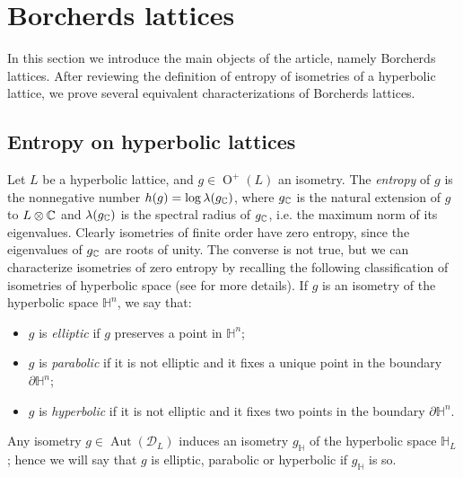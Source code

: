 \documentclass[11pt,letterpaper]{amsart}
\DeclareMathOperator{\Aut}{Aut}
\DeclareMathOperator{\Or}{O}
\begin{document}
\section{Borcherds lattices} \label{sec:Borcherds.lattices}

In this section we introduce the main objects of the article, namely Borcherds lattices. After reviewing the definition of entropy of isometries of a hyperbolic lattice, we prove several equivalent characterizations of Borcherds lattices.

\subsection{Entropy on hyperbolic lattices}

Let $L$ be a hyperbolic lattice, and $g\in \Or^+(L)$ an isometry. The \emph{entropy} of $g$ is the nonnegative number $h(g)=\log{\lambda(g_{\mathbb{C}})}$, where $g_{\mathbb{C}}$ is the natural extension of $g$ to $L\otimes \mathbb{C}$ and $\lambda(g_{\mathbb{C}})$ is the spectral radius of $g_{\mathbb{C}}$, i.e. the maximum norm of its eigenvalues.
Clearly isometries of finite order have zero entropy, since the eigenvalues of $g_{\mathbb{C}}$ are roots of unity. The converse is not true, but we can characterize isometries of zero entropy by recalling the following classification of isometries of hyperbolic space (see \cite{ratcliffe} for more details).
If $g$ is an isometry of the hyperbolic space $\mathbb{H}^n$, we say that:
\begin{itemize}
    \item $g$ is \emph{elliptic} if $g$ preserves a point in $\mathbb{H}^n$;
    \item $g$ is \emph{parabolic} if it is not elliptic and it fixes a unique point in the boundary $\partial\mathbb{H}^n$;
    \item $g$ is \emph{hyperbolic} if it is not elliptic and it fixes two points in the boundary $\partial\mathbb{H}^n$.
\end{itemize}

Any isometry $g\in \Aut(\mathcal{D}_L)$ induces an isometry $g_\mathbb{H}$
of the hyperbolic space $\mathbb{H}_L$; hence we will say that $g$ is elliptic, parabolic or hyperbolic if $g_\mathbb{H}$ is so.
\end{document}
